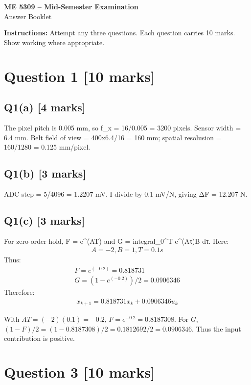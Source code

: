 \documentclass[11pt,a4paper]{article}
\begin{document}
\begin{center}
{\Large\bfseries ME 5309 -- Mid-Semester Examination}\\[3pt]
{\large Answer Booklet}\\[8pt]
\end{center}
\textbf{Instructions:} Attempt any three questions. Each question carries 10 marks. Show working where appropriate.
\section*{Question 1 \hfill [10 marks]}
\subsection*{Q1(a) \hfill [4 marks]}

The pixel pitch is 0.005 mm, so f\_x = 16/0.005 = 3200 pixels.
Sensor width = 6.4 mm.
Belt field of view = 400x6.4/16 = 160 mm; spatial resolusion = 160/1280 = 0.125 mm/pixel.

\subsection*{Q1(b) \hfill [3 marks]}

ADC step = 5/4096 = 1.2207 mV.
I divide by 0.1 mV/N, giving ΔF = 12.207 N.

\subsection*{Q1(c) \hfill [3 marks]}

For zero-order hold, F = e\textasciicircum{}(AT) and G = integral\_0\textasciicircum{}T e\textasciicircum{}(Aτ)B dτ.
Here:\[\begin{aligned}A = -2, B = 1, T = 0.1 s\end{aligned}\]
Thus:\[\begin{aligned}F = e^(-0.2) = 0.818731\\ G = (1-e^(-0.2))/2 = 0.0906346\end{aligned}\]
Therefore:\[\begin{aligned}x_{k+1} = 0.818731 x_k + 0.0906346 u_k\end{aligned}\]\par\smallskip With $AT=(-2)(0.1)=-0.2$, $F=e^{-0.2}=0.8187308$. For $G$, $(1-F)/2=(1-0.8187308)/2=0.1812692/2=0.0906346$. Thus the input contribution is positive.

\section*{Question 3 \hfill [10 marks]}
\end{document}
